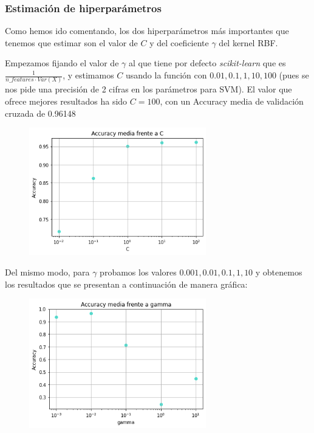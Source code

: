 \documentclass[a4]{article}
\begin{document}
\subsubsection{Estimación de hiperparámetros}

Como hemos ido comentando, los dos hiperparámetros más importantes que tenemos que estimar son el valor de $C$ y del coeficiente $\gamma$ del kernel RBF. 

Empezamos fijando el valor de $\gamma$ al que tiene por defecto \textit{scikit-learn} que es $ \frac{1}{n\_features\cdot Var(X)}$, y estimamos $C$ usando la función  con $0.01,0.1,1,10,100$ (pues se nos pide una precisión de 2 cifras en los parámetros para SVM). El valor que ofrece mejores resultados ha sido $C=100$, con un Accuracy media de validación cruzada de 0.96148

\begin{figure}[H]
    \centering
    \includegraphics[width=77mm]{img/svm_C.png}
	\label{fig:C}
\end{figure}

Del mismo modo, para $\gamma$ probamos los valores $0.001,0.01,0.1,1,10$ y obtenemos los resultados que se presentan a continuación de manera gráfica: 

\begin{figure}[H]
    \centering
    \includegraphics[width=77mm]{img/svm_gamma.png}
	\label{fig:gamma}
\end{figure}
\end{document}
